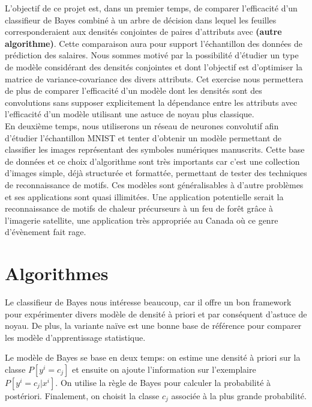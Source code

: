 \documentclass[12pt,letterpaper]{article}
\begin{document}
L'objectif de ce projet est, dans un premier temps, de comparer l'efficacité
d'un classifieur de Bayes combiné à un arbre de décision dans lequel les
feuilles corresponderaient aux densités conjointes de paires d'attributs avec
\textbf{(autre algorithme)}. Cette comparaison aura pour support l'échantillon des
données de prédiction des salaires. Nous sommes motivé par la possibilité d'étudier
un type de modèle considérant des densités conjointes et dont l'objectif est
d'optimiser la matrice de variance-covariance des divers attributs. Cet exercise
nous permettera de plus de comparer l'efficacité d'un modèle dont les densités
sont des convolutions sans supposer explicitement la dépendance entre les
attributs avec l'efficacité d'un modèle utilisant une astuce de noyau plus classique. \\

En deuxième temps, nous utiliserons un réseau de neurones convolutif afin
d'étudier l'échantillon MNIST et tenter d'obtenir un modèle permettant de
classifier les images représentant des symboles numériques manuscrits. Cette
base de données et ce choix d'algorithme sont très importants car c'est une
collection d'images simple, déjà structurée et formattée, permettant de tester
des techniques de reconnaissance de motifs. Ces modèles sont généralisables à
d'autre problèmes et ses applications sont quasi illimitées. Une application
potentielle serait la reconnaissance de motifs de chaleur précurseurs à un feu
de forêt grâce à l'imagerie satellite, une application très appropriée au
Canada où ce genre d'évènement fait rage. \\


\section{Algorithmes}

Le classifieur de Bayes nous intéresse beaucoup, car il offre un bon framework
pour expérimenter divers modèle de densité à priori et par conséquent d'astuce
de noyau. De plus, la variante naïve est une bonne base de référence pour
comparer les modèle d'apprentissage statistique.

Le modèle de Bayes se base en deux temps: on estime une densité à priori sur la
classe $P[y^i = c_j]$ et ensuite on ajoute l'information sur l'exemplaire
$P[y^i = c_j | x^i]$. On utilise la règle de Bayes pour calculer la probabilité
à postériori. Finalement, on choisit la classe $c_j$ associée à la plus grande
probabilité.  \\
\end{document}
